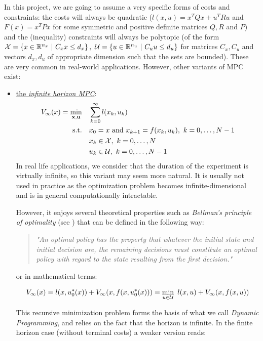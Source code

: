 \documentclass[12pt]{article}
\begin{document}
In this project, we are going to assume a very specific forms of costs and constraints: the costs will always be quadratic ($l(x,u)=x^TQx+u^TRu$ and $F(x)=x^TPx$ for some symmetric and positive definite matrices $Q,R$ and $P$) and the (inequality) constraints will always be polytopic (of the form $\cal{X}=\left\{x\in\R^{n_x}~|~C_xx\leq d_x\right\},~\cal{U}=\left\{u\in\R^{n_u}~|~C_uu\leq d_u\right\}$ for matrices $C_x,C_u$ and vectors $d_x,d_u$ of appropriate dimension such that the sets are bounded).
These are very common in real-world applications.
However, other variants of MPC exist:
\begin{itemize}[label=\textbullet]
	\item \underline{the \textit{infinite horizon MPC}}:
	\begin{align*}
		V_\infty(x)=\underset{\bf{x},\bf{u}}{\min} &\quad \sum_{k=0}^{\infty}l(x_k,u_k)\\
		\text{s.t.} &\quad x_0=x\text{ and }x_{k+1}=f(x_k,u_k),~k=0,\ldots,N-1\\
		&\quad x_k\in\cal{X},~k=0,\ldots,N\\
		&\quad u_k\in\cal{U},~k=0,\ldots,N-1
	\end{align*}
	In real life applications, we consider that the duration of the experiment is virtually infinite, so this variant may seem more natural.
	It is usually not used in practice as the optimization problem becomes infinite-dimensional and is in general computationally intractable.

	However, it enjoys several theoretical properties such as \textit{Bellman's principle of optimality} (see \cite{Bellman:DynamicProgramming}) that can be defined in the following way:
	\begin{quotation}
		\textit{"An optimal policy has the property that whatever the initial state and initial decision are, the remaining decisions must constitute an optimal policy with regard to the state resulting from the first decision."}
	\end{quotation}
	or in mathematical terms:

	\begin{equation}
		\label{eq:inf-bellman}
		V_\infty(x)=l(x,u_0^*(x))+V_\infty(x,f(x,u_0^*(x)))=\min_{u\in\cal{U}}~l(x,u)+V_\infty(x,f(x,u))
	\end{equation}

	\noindent This recursive minimization problem forms the basis of what we call \textit{Dynamic Programming}, and relies on the fact that the horizon is infinite.
	In the finite horizon case (without terminal costs) a weaker version reads:


\end{itemize}
\end{document}
